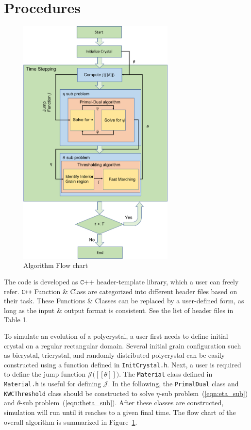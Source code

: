 \documentclass[11pt]{article}
\begin{document}
\section{Procedures}

\begin{figure}
\begin{center}
\includegraphics[width=0.7\textwidth]{Figures/flowChart.pdf}
\end{center}
\caption{Algorithm Flow chart}
\label{fig:flow_chart}
\end{figure}

The code is developed as $\texttt{C++}$ header-template library,
which a user can freely refer. 
\texttt{C++} Function \& Class are categorized into different header
files based on their task. 
These Functions \& Classes can be replaced by a user-defined form, 
as long as the input \& output format is consistent. 
See the list of header files in Table 1. 

To simulate an evolution of a polycrystal, a user first needs to define 
initial crystal on a regular rectangular domain.  
Several initial grain configuration 
such as bicrystal, tricrystal, and randomly distributed polycrystal
can be easily constructed using a function defined in \texttt{InitCrystal.h}.
Next, a user is required to define the jump function $\mathcal{J}\big( [\![\theta ]\!]\big)$.
The \texttt{Material} class defined in \texttt{Material.h} is useful for defining $\mathcal{J}$.
In the following, the \texttt{PrimalDual} class and 
\texttt{KWCThreshold} class should be constructed to
solve $\eta$-sub problem~(\ref{eqn:eta_sub}) and 
$\theta$-sub problem~(\ref{eqn:theta_sub}). 
After these classes are constructed, 
simulation will run until it reaches to a given final time. 
The flow chart of the overall algorithm is summarized 
in Figure~\ref{fig:flow_chart}. 
\end{document}
